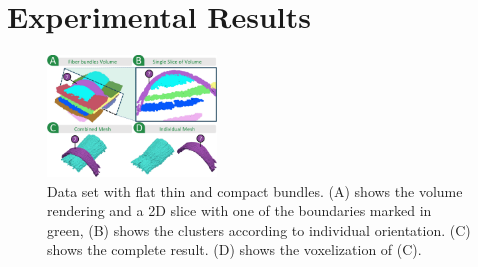 \section {Experimental Results}
\label {sec:results}
%	

\begin{figure}[t]
\centering
	\includegraphics[width=0.4\textwidth, trim = 0mm 30mm 0mm 0mm, clip,]{images_pvis/figure8}
	\caption{Data set with flat thin and compact bundles. (A) shows the volume rendering and a 2D slice with one of the boundaries marked in green, (B) shows the clusters according to individual orientation. (C) shows the complete result. (D) shows the voxelization of (C).}
	\label{fig:prepreg}
\end{figure}


